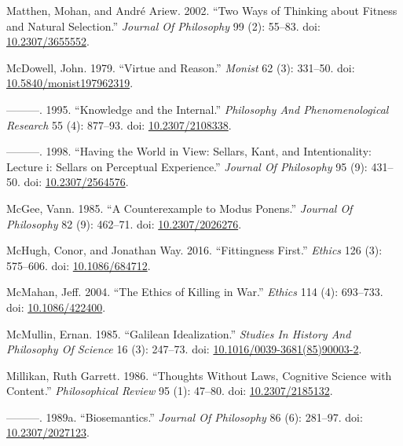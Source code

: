 \documentclass[
  10pt,
  letterpaper,
  DIV=11,
  numbers=noendperiod,
  twoside]{scrartcl}
\newlength{\cslhangindent}
\newenvironment{CSLReferences}[2] %
 {\begin{list}{}{%
  \setlength{\itemindent}{0pt}
  \setlength{\leftmargin}{0pt}
  \setlength{\parsep}{0pt}
  \ifodd #1
   \setlength{\leftmargin}{\cslhangindent}
   \setlength{\itemindent}{-1\cslhangindent}
  \fi
  \setlength{\itemsep}{#2\baselineskip}}}
 {\end{list}}
\begin{document}
\begin{CSLReferences}{1}{0}
Matthen, Mohan, and André Ariew. 2002. {``Two Ways of Thinking about
Fitness and Natural Selection.''} \emph{Journal Of Philosophy} 99 (2):
55--83. doi: \href{https://doi.org/10.2307/3655552}{10.2307/3655552}.

McDowell, John. 1979. {``Virtue and Reason.''} \emph{Monist} 62 (3):
331--50. doi:
\href{https://doi.org/10.5840/monist197962319}{10.5840/monist197962319}.

---------. 1995. {``Knowledge and the Internal.''} \emph{Philosophy And
Phenomenological Research} 55 (4): 877--93. doi:
\href{https://doi.org/10.2307/2108338}{10.2307/2108338}.

---------. 1998. {``Having the World in View: Sellars, Kant, and
Intentionality: Lecture i: Sellars on Perceptual Experience.''}
\emph{Journal Of Philosophy} 95 (9): 431--50. doi:
\href{https://doi.org/10.2307/2564576}{10.2307/2564576}.

McGee, Vann. 1985. {``A Counterexample to Modus Ponens.''} \emph{Journal
Of Philosophy} 82 (9): 462--71. doi:
\href{https://doi.org/10.2307/2026276}{10.2307/2026276}.

McHugh, Conor, and Jonathan Way. 2016. {``Fittingness First.''}
\emph{Ethics} 126 (3): 575--606. doi:
\href{https://doi.org/10.1086/684712}{10.1086/684712}.

McMahan, Jeff. 2004. {``The Ethics of Killing in War.''} \emph{Ethics}
114 (4): 693--733. doi:
\href{https://doi.org/10.1086/422400}{10.1086/422400}.

McMullin, Ernan. 1985. {``Galilean Idealization.''} \emph{Studies In
History And Philosophy Of Science} 16 (3): 247--73. doi:
\href{https://doi.org/10.1016/0039-3681(85)90003-2}{10.1016/0039-3681(85)90003-2}.

Millikan, Ruth Garrett. 1986. {``Thoughts Without Laws, Cognitive
Science with Content.''} \emph{Philosophical Review} 95 (1): 47--80.
doi: \href{https://doi.org/10.2307/2185132}{10.2307/2185132}.

---------. 1989a. {``Biosemantics.''} \emph{Journal Of Philosophy} 86
(6): 281--97. doi:
\href{https://doi.org/10.2307/2027123}{10.2307/2027123}.


\end{CSLReferences}
\end{document}
